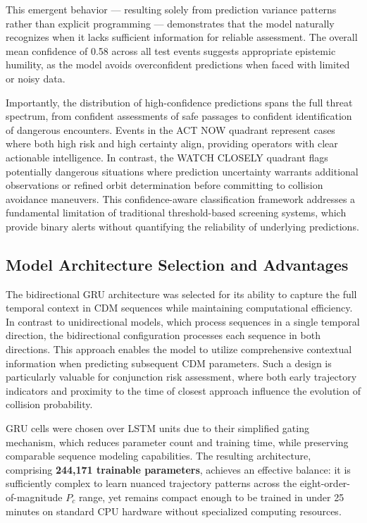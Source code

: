 \documentclass[12pt, a4paper]{article}
\begin{document}
This emergent behavior — resulting solely from prediction variance patterns rather than explicit programming — demonstrates that the model naturally recognizes when it lacks sufficient information for reliable assessment. The overall mean confidence of 0.58 across all test events suggests appropriate epistemic humility, as the model avoids overconfident predictions when faced with limited or noisy data.

Importantly, the distribution of high-confidence predictions spans the full threat spectrum, from confident assessments of safe passages to confident identification of dangerous encounters. Events in the ACT NOW quadrant represent cases where both high risk and high certainty align, providing operators with clear actionable intelligence. In contrast, the WATCH CLOSELY quadrant flags potentially dangerous situations where prediction uncertainty warrants additional observations or refined orbit determination before committing to collision avoidance maneuvers. This confidence-aware classification framework addresses a fundamental limitation of traditional threshold-based screening systems, which provide binary alerts without quantifying the reliability of underlying predictions.

\subsection{Model Architecture Selection and Advantages}

The bidirectional GRU architecture was selected for its ability to capture the full temporal context in CDM sequences while maintaining computational efficiency. In contrast to unidirectional models, which process sequences in a single temporal direction, the bidirectional configuration processes each sequence in both directions. This approach enables the model to utilize comprehensive contextual information when predicting subsequent CDM parameters. Such a design is particularly valuable for conjunction risk assessment, where both early trajectory indicators and proximity to the time of closest approach influence the evolution of collision probability.

GRU cells were chosen over LSTM units due to their simplified gating mechanism, which reduces parameter count and training time, while preserving comparable sequence modeling capabilities. The resulting architecture, comprising \textbf{244,171 trainable parameters}, achieves an effective balance: it is sufficiently complex to learn nuanced trajectory patterns across the eight-order-of-magnitude $P_c$ range, yet remains compact enough to be trained in under 25 minutes on standard CPU hardware without specialized computing resources.
\end{document}
